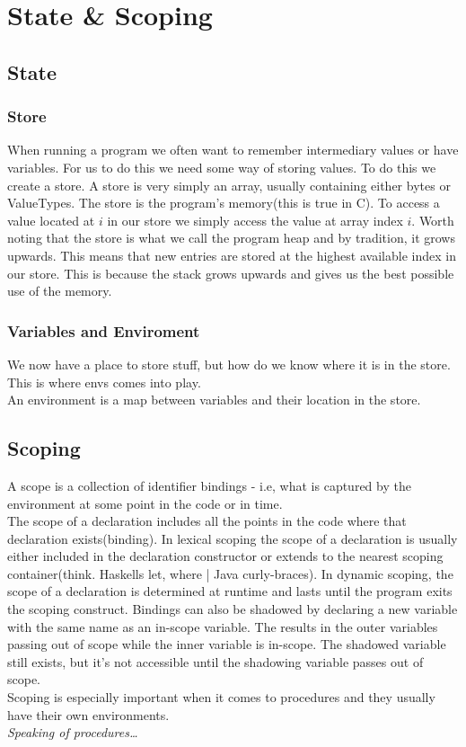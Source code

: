\documentclass[tikz, border=5mm]{article}
\begin{document}
    \section{State \& Scoping}
        \subsection{State}
        \subsubsection{Store}
        When running a program we often want to remember intermediary values or have variables. For us to do this we need some way of storing values.
        To do this we create a \gls{store}. A store is very simply an array, usually containing either bytes or ValueTypes. 
        The store is the program's memory(this is true in C). To access a value located at $i$ in our store we simply access the value at array index $i$.
        Worth noting that the store is what we call the program heap and by tradition, it grows upwards. This means that new entries are stored at the highest available index in our store.
        This is because the stack grows upwards and gives us the best possible use of the memory.
        \subsubsection{Variables and Enviroment}
        We now have a place to store stuff, but how do we know where it is in the store. This is where \glspl{env} comes into play.\\
        An environment is a map between variables and their location in the store. 
        \subsection{Scoping}
        A \gls{scope} is a collection of identifier bindings - i.e, what is captured by the environment at some point in the code or in time.\\
        The scope of a declaration includes all the points in the code where that declaration exists(binding). In lexical scoping the
        scope of a declaration is usually either included in the declaration constructor or extends to the nearest scoping container(think. Haskells let, where | Java curly-braces).
        In dynamic scoping, the scope of a declaration is determined at runtime and lasts until the program exits the scoping construct.
        Bindings can also be shadowed by declaring a new variable with the same name as an in-scope variable. 
        The results in the outer variables passing out of scope while the inner variable is in-scope.
        The shadowed variable still exists, but it's not accessible until the shadowing variable passes out of scope.\\
        Scoping is especially important when it comes to procedures and they usually have their own environments.\\
        \textit{Speaking of procedures\dots}
\end{document}
